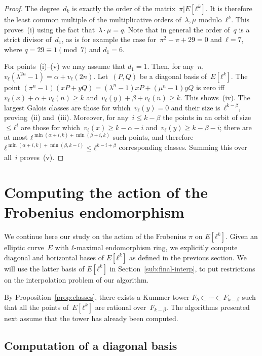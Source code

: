 \documentclass{lms}
\begin{document}
\begin{proof}
The degree~$d_k$ is exactly the order of the matrix~$π|E[ℓ^k]$.
It is therefore the least common multiple of the multiplicative orders
of~$λ, μ$ modulo~$ℓ^k$.
This proves~(i) using the fact that~$λ · μ = q$.
Note that in general the order of~$q$ is a strict divisor of~$d_1$,
as is for example the case for~$π^2 - π + 29 = 0$ and~$ℓ = 7$,
where $q = 29 ≡ 1 \pmod{7}$ and $d_1 = 6$.

For points~(i)--(v) we may assume that $d_1 = 1$.
Then, for any~$n$, $v_ℓ(λ^{2n}-1) = α + v_{ℓ} (2n)$.
Let~$(P, Q)$ be a diagonal basis of~$E[ℓ^k]$.
The point $(π^n - 1) (x P + y Q) = (λ^n-1) x P + (μ^n-1) y Q$
is zero iff $v_{ℓ} (x) + α + v_{ℓ} (n) ≥ k$
and~$v_{ℓ} (y) + β + v_{ℓ} (n) ≥ k$. This shows~(iv).
The largest Galois classes
are those for which~$v_{ℓ} (y) = 0$ and their size is~$ℓ^{k - β}$,
proving~(ii) and~(iii).
Moreover, for any~$i ≤ k-β$ the points in an orbit of size~$≤ ℓ^i$
are those for which~$v_{ℓ} (x) ≥ k - α - i$ and~$v_{ℓ} (y) ≥ k - β - i$;
there are at most $ℓ^{\min(α+i, k) + \min (β+i, k)}$ such points,
and therefore $ℓ^{\min(α+i, k) + \min(β, k-i)} ≤ ℓ^{k-i+β}$
corresponding classes.
Summing this over all~$i$ proves~(v).
\end{proof}
\section{Computing the action of the Frobenius endomorphism}
\label{sec:acti-frob-endm}

We continue here our study on the action of the Frobenius $π$ on
$E[ℓ^k]$.  Given an elliptic curve~$E$ with $ℓ$-maximal endomorphism
ring, we explicitly compute diagonal and horizontal bases of $E[ℓ^k]$
as defined in the previous section.  We will use the latter basis of
$E[ℓ^k]$ in Section~\ref{sub:final-interp}, to put restrictions on the
interpolation problem of our algorithm.

By Proposition~\ref{prop:classes}, there exists a Kummer tower
$F₀⊂\cdots⊂F_{k-\beta}$ such that all the points of~$E[ℓ^k]$ are
rational over~$F_{k-\beta}$. The algorithms presented next assume that
the tower has already been computed.

\subsection{Computation of a diagonal basis}
\label{ss:diagonal}
\end{document}
